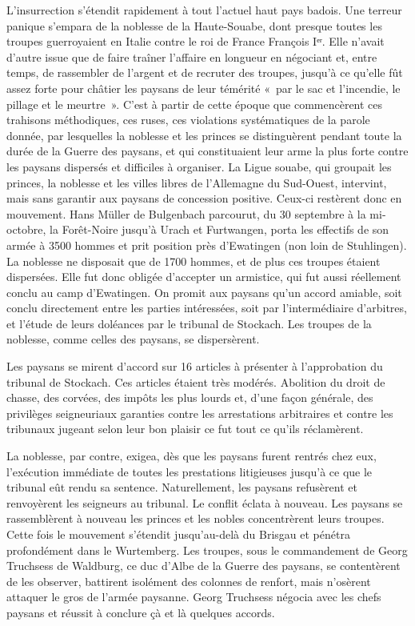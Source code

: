 \documentclass[french,twoside]{book} %
\begin{document}
L’insurrection s’étendit rapidement à tout l’actuel haut pays badois. Une terreur panique s’empara de la noblesse de la Haute-Souabe, dont presque toutes les troupes guerroyaient en Italie contre le roi de France François Iᵉʳ. Elle n’avait d’autre issue que de faire traîner l’affaire en longueur en négociant et, entre temps, de rassembler de l’argent et de recruter des troupes, jusqu’à ce qu’elle fût assez forte pour châtier les paysans de leur témérité « par le sac et l’incendie, le pillage et le meurtre ». C’est à partir de cette époque que commencèrent ces trahisons méthodiques, ces ruses, ces violations systématiques de la parole donnée, par lesquelles la noblesse et les princes se distinguèrent pendant toute la durée de la Guerre des paysans, et qui constituaient leur arme la plus forte contre les paysans dispersés et difficiles à organiser. La Ligue souabe, qui groupait les princes, la noblesse et les villes libres de l’Allemagne du Sud-Ouest, intervint, mais sans garantir aux paysans de concession positive. Ceux-ci restèrent donc en mouvement. Hans Müller de Bulgenbach parcourut, du 30 septembre à la mi-octobre, la Forêt-Noire jusqu’à Urach et Furtwangen, porta les effectifs de son armée à 3500 hommes et prit position près d’Ewatingen (non loin de Stuhlingen). La noblesse ne disposait que de 1700 hommes, et de plus ces troupes étaient dispersées. Elle fut donc obligée d’accepter un armistice, qui fut aussi réellement conclu au camp d’Ewatingen. On promit aux paysans qu’un accord amiable, soit conclu directement entre les parties intéressées, soit par l’intermédiaire d’arbitres, et l’étude de leurs doléances par le tribunal de Stockach. Les troupes de la noblesse, comme celles des paysans, se dispersèrent.\par
Les paysans se mirent d’accord sur 16 articles à présenter à l’approbation du tribunal de Stockach. Ces articles étaient très modérés. Abolition du droit de chasse, des corvées, des impôts les plus lourds et, d’une façon générale, des privilèges seigneuriaux garanties contre les arrestations arbitraires et contre les tribunaux jugeant selon leur bon plaisir ce fut tout ce qu’ils réclamèrent.\par
La noblesse, par contre, exigea, dès que les paysans furent rentrés chez eux, l’exécution immédiate de toutes les prestations litigieuses jusqu’à ce que le tribunal eût rendu sa sentence. Naturellement, les paysans refusèrent et renvoyèrent les seigneurs au tribunal. Le conflit éclata à nouveau. Les paysans se rassemblèrent à nouveau les princes et les nobles concentrèrent leurs troupes. Cette fois le mouvement s’étendit jusqu’au-delà du Brisgau et pénétra profondément dans le Wurtemberg. Les troupes, sous le commandement de Georg Truchsess de Waldburg, ce duc d’Albe de la Guerre des paysans, se contentèrent de les observer, battirent isolément des colonnes de renfort, mais n’osèrent attaquer le gros de l’armée paysanne. Georg Truchsess négocia avec les chefs paysans et réussit à conclure çà et là quelques accords.\par
\end{document}
